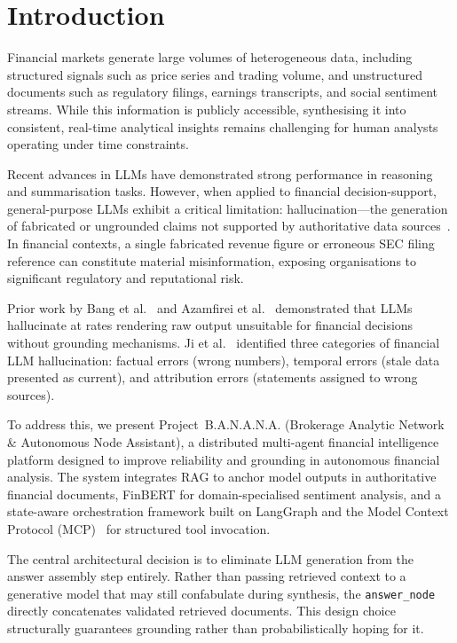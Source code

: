 \documentclass[10pt,twocolumn]{article}
\newcommand{\banana}{\mbox{B.A.N.A.N.A.}}
\newcommand{\node}[1]{\texttt{#1}}
\begin{document}
\section{Introduction}
\label{sec:intro}

Financial markets generate large volumes of heterogeneous data,
including structured signals such as price series and trading volume,
and unstructured documents such as regulatory filings, earnings
transcripts, and social sentiment streams.
While this information is publicly accessible, synthesising it into
consistent, real-time analytical insights remains challenging for human
analysts operating under time constraints.

Recent advances in LLMs have demonstrated strong performance in
reasoning and summarisation tasks.
However, when applied to financial decision-support, general-purpose
LLMs exhibit a critical limitation: hallucination---the generation of
fabricated or ungrounded claims not supported by authoritative data
sources~\cite{ji2023hallucination}.
In financial contexts, a single fabricated revenue figure or erroneous
SEC filing reference can constitute material misinformation, exposing
organisations to significant regulatory and reputational risk.

Prior work by Bang et al.~\cite{bang2023} and Azamfirei et al.~\cite{azamfirei2023} demonstrated that LLMs hallucinate at rates
rendering raw output unsuitable for financial decisions without
grounding mechanisms.
Ji et al.~\cite{ji2023hallucination} identified three categories of
financial LLM hallucination: factual errors (wrong numbers), temporal
errors (stale data presented as current), and attribution errors
(statements assigned to wrong sources).

To address this, we present Project~\banana{}
(Brokerage Analytic Network \& Autonomous Node Assistant), a
distributed multi-agent financial intelligence platform designed to
improve reliability and grounding in autonomous financial analysis.
The system integrates RAG to anchor model outputs in authoritative
financial documents, FinBERT for domain-specialised sentiment analysis,
and a state-aware orchestration framework built on LangGraph and the
Model Context Protocol (MCP)~\cite{mcp2024} for structured tool
invocation.

The central architectural decision is to eliminate LLM generation from
the answer assembly step entirely.
Rather than passing retrieved context to a generative model that may
still confabulate during synthesis, the \node{answer\_node} directly
concatenates validated retrieved documents.
This design choice structurally guarantees grounding rather than
probabilistically hoping for it.
\end{document}
